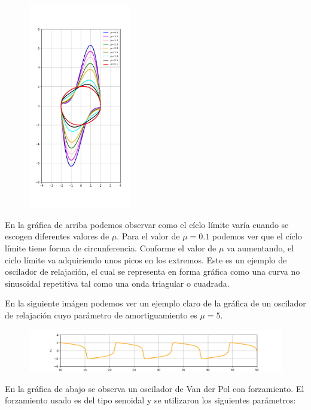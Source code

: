\documentclass[a4paper]{article}
\begin{document}
\begin{figure}[ht!]
\centering
\includegraphics[width=0.4\textwidth]{Figura2.png}
\end{figure}

En la gráfica de arriba podemos observar como el cíclo límite varía cuando se escogen diferentes valores de $\mu$. Para el valor de $\mu=0.1$ podemos ver que el cíclo límite tiene forma de circunferencia. Conforme el valor de $\mu$ va aumentando, el ciclo límite va adquiriendo unos picos en los extremos.
Este es un ejemplo de oscilador de relajación, el cual  se representa en forma gráfica como una curva no sinusoidal repetitiva tal como una onda triagular o cuadrada.

\newpage
En la siguiente imágen podemos ver un ejemplo claro de la gráfica de un oscilador de relajación cuyo parámetro de amortiguamiento es $\mu=5$.


\begin{figure}[ht!]
\centering
\includegraphics[width=1\textwidth]{Figura3.png}
\end{figure}

En la gráfica de abajo se observa un oscilador de Van der Pol con forzamiento.
El forzamiento usado es del tipo senoidal y se utilizaron los siguientes parámetros: \\
\end{document}
